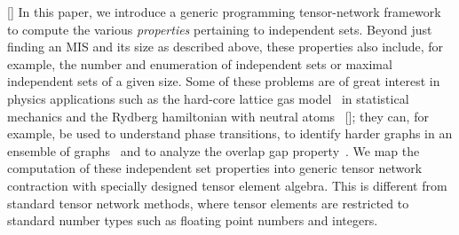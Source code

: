 \documentclass[onefignum, onetabnum]{siamart190516}
\newcommand{\<}{\langle}
\renewcommand{\>}{\rangle}
\newcommand{\red}[1]{[{\bf  \color{red}{ST: #1}}]}
\newcommand{\blue}[1]{[{\bf  \color{blue}{JG: #1}}]}
\newcounter{example}
\begin{document}
\blue{We need to distinct ourself in the problem we want to solve.}
In this paper, we introduce a generic programming tensor-network framework to compute the various \textit{properties} pertaining to independent sets. 
Beyond just finding an MIS and its size as described above, these properties also include, for example, the number and enumeration of independent sets or maximal independent sets of a given size.
Some of these problems are of great interest in physics applications such as the hard-core lattice gas model~\cite{Dyre2016, Fernandes2007}
in statistical mechanics and the Rydberg hamiltonian with neutral atoms~\cite{Pichler2018, Ebadi2022} \red{replace with experiment paper when ready};
they can, for example, be used to understand phase transitions, to identify harder graphs in an ensemble of graphs~\cite{Ebadi2022} and to analyze the overlap gap property~\cite{Gamarnik2013, Gamarnik2019}. We map the computation of these independent set properties into generic tensor network contraction with specially designed tensor element algebra. This is different from standard tensor network methods, where tensor elements are restricted to standard number types such as floating point numbers and integers.
\end{document}

